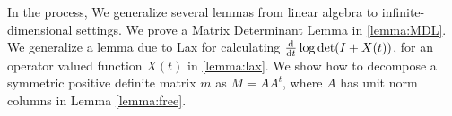 

In the process, We generalize several lemmas from linear algebra to
infinite-dimensional settings. We prove a Matrix Determinant Lemma in
\ref{lemma:MDL}. We generalize a lemma due to Lax \cite{Lax07} for
calculating $\frac{\text{\textup{d}}}{\text{\textup{d}} t} \log \det (I + X(t))$, for an
operator valued function $X(t)$ in \ref{lemma:lax}. We show how to
decompose a symmetric positive definite matrix $m$ as $M = AA^t$,
where $A$ has unit norm columns in Lemma \ref{lemma:free}.

